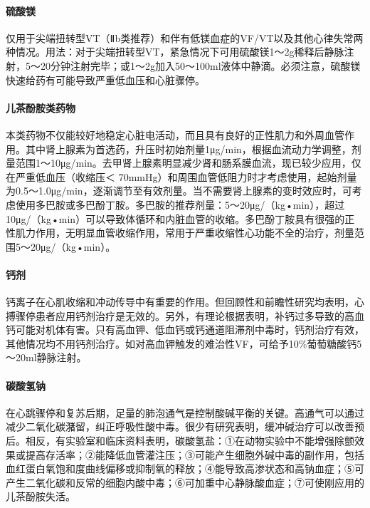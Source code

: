 \paragraph{硫酸镁}

仅用于尖端扭转型VT（Ⅱb类推荐）和伴有低镁血症的VF/VT以及其他心律失常两种情况。用法：对于尖端扭转型VT，紧急情况下可用硫酸镁1～2g稀释后静脉注射，5～20分钟注射完毕；或1～2g加入50～100ml液体中静滴。必须注意，硫酸镁快速给药有可能导致严重低血压和心脏骤停。

\paragraph{儿茶酚胺类药物}

本类药物不仅能较好地稳定心脏电活动，而且具有良好的正性肌力和外周血管作用。其中肾上腺素为首选药，升压时初始剂量1μg/min，根据血流动力学调整，剂量范围1～10μg/min。去甲肾上腺素明显减少肾和肠系膜血流，现已较少应用，仅在严重低血压（收缩压＜
70mmHg）和周围血管低阻力时才考虑使用，起始剂量为0.5～1.0μg/min，逐渐调节至有效剂量。当不需要肾上腺素的变时效应时，可考虑使用多巴胺或多巴酚丁胺。多巴胺的推荐剂量：5～20μg/（kg•min），超过10μg/（kg•min）可以导致体循环和内脏血管的收缩。多巴酚丁胺具有很强的正性肌力作用，无明显血管收缩作用，常用于严重收缩性心功能不全的治疗，剂量范围5～20μg/（kg•min）。

\paragraph{钙剂}

钙离子在心肌收缩和冲动传导中有重要的作用。但回顾性和前瞻性研究均表明，心搏骤停患者应用钙剂治疗是无效的。另外，有理论根据表明，补钙过多导致的高血钙可能对机体有害。只有高血钾、低血钙或钙通道阻滞剂中毒时，钙剂治疗有效，其他情况均不用钙剂治疗。如对高血钾触发的难治性VF，可给予10\%葡萄糖酸钙5～20ml静脉注射。

\paragraph{碳酸氢钠}

在心跳骤停和复苏后期，足量的肺泡通气是控制酸碱平衡的关键。高通气可以通过减少二氧化碳潴留，纠正呼吸性酸中毒。很少有研究表明，缓冲碱治疗可以改善预后。相反，有实验室和临床资料表明，碳酸氢盐：①在动物实验中不能增强除颤效果或提高存活率；②能降低血管灌注压；③可能产生细胞外碱中毒的副作用，包括血红蛋白氧饱和度曲线偏移或抑制氧的释放；④能导致高渗状态和高钠血症；⑤可产生二氧化碳和反常的细胞内酸中毒；⑥可加重中心静脉酸血症；⑦可使刚应用的儿茶酚胺失活。

